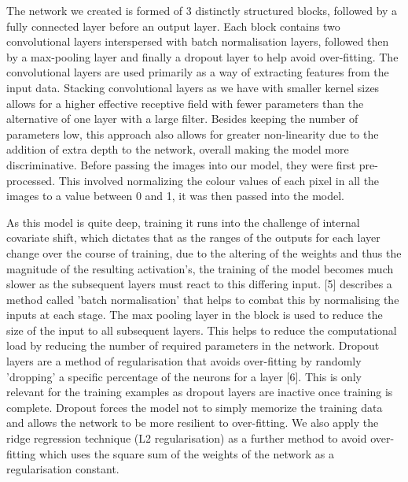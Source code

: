 \documentclass[journal]{IEEEtran}
\begin{document}
The network we created is formed of 3 distinctly structured blocks, followed by a fully connected layer before an output layer. Each block contains two convolutional layers interspersed with batch normalisation layers, followed then by a max-pooling layer and finally a dropout layer to help avoid over-fitting. The convolutional layers are used primarily as a way of extracting features from the input data. Stacking convolutional layers as we have with smaller kernel sizes allows for a higher effective receptive field with fewer parameters than the alternative of one layer with a large filter. Besides keeping the number of parameters low, this approach also allows for greater non-linearity due to the addition of extra depth to the network, overall making the model more discriminative. Before passing the images into our model, they were first pre-processed. This involved normalizing the colour values of each pixel in all the images to a value between 0 and 1, it was then passed into the model.\par
As this model is quite deep, training it runs into the challenge of internal covariate shift, which dictates that as the ranges of the outputs for each layer change over the course of training, due to the altering of the weights and thus the magnitude of the resulting activation's, the training of the model becomes much slower as the subsequent layers must react to this differing input. [5] describes a method called 'batch normalisation' that helps to combat this by normalising the inputs at each stage. The max pooling layer in the block is used to reduce the size of the input to all subsequent layers. This helps to reduce the computational load by reducing the number of required parameters in the network. Dropout layers are a method of regularisation that avoids over-fitting by randomly 'dropping' a specific percentage of the neurons for a layer [6]. This is only relevant for the training examples as dropout layers are inactive once training is complete. Dropout forces the model not to simply memorize the training data and allows the network to be more resilient to over-fitting. We also apply the ridge regression technique (L2 regularisation) as a further method to avoid over-fitting which uses the square sum of the weights of the network as a regularisation constant.\par
\end{document}
